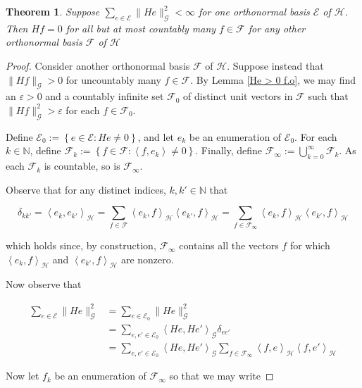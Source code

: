 \documentclass[10pt,a4paper]{amsart}
\newtheorem{theorem}{Theorem}
\newcommand{\N}{\mathbb{N}}
\newcommand{\aset}[1]{\left \langle #1 \right \rangle}
\newcommand{\bset}[1]{\left \lbrace #1 \right \rbrace}
\begin{document}
\begin{theorem} \label{He > 0 f.o. regardless of ONB}
    Suppose $\sum_{e \in \mathscr E} \|He\|_\mathcal G^2 < \infty$ for one orthonormal basis $\mathscr E$ of $\mathcal H$. Then $Hf = 0$ for all but at most countably many $f \in \mathscr F$ for any other orthonormal basis $\mathscr F$ of $\mathcal H$
\end{theorem}

\begin{proof}
    Consider another orthonormal basis $\mathscr F$ of $\mathcal H$. Suppose instead that $\|Hf\|_\mathcal G > 0$ for uncountably many $f \in \mathscr F$. By Lemma \ref{He > 0 f.o}, we may find an $\varepsilon > 0$ and a countably infinite set $\mathscr F_0$ of distinct unit vectors in $\mathscr F$ such that $\|Hf\|^2_\mathcal G > \varepsilon$ for each $f \in \mathscr F_0$.

    Define $\mathscr E_0 := \bset{e \in \mathscr E: He \neq 0}$, and let $e_k$ be an enumeration of $\mathscr E_0$. For each $k \in \N$, define $\mathscr F_k := \bset{f \in \mathscr F: \aset{f, e_k} \neq 0} $. Finally, define $\mathscr F_\infty := \bigcup_{k=0}^\infty \mathscr F_k$. As each $\mathscr F_k$ is countable, so is $\mathscr F_\infty$. 
    
   Observe that for any distinct indices, $k, k' \in \N$ that 

   $$\delta_{kk'} = \aset{e_k, e_{k'}}_\mathcal H = \sum_{f \in \mathscr F} \aset{e_k, f}_\mathcal H \aset{e_{k'}, f}_\mathcal H = \sum_{f \in \mathscr F_\infty} \aset{e_k, f}_\mathcal H \aset{e_{k'}, f}_\mathcal H$$

   which holds since, by construction, $\mathscr F_\infty$ contains all the vectors $f$ for which $\aset{e_k,f}_\mathcal H$ and $\aset{e_{k'}, f}_\mathcal H$ are nonzero. 
    
    Now observe that 

    \begin{align*}
        \sum_{e \in \mathscr E} \|He\|^2_\mathcal G
        &= 
         \sum_{e \in \mathscr E_0} \|He\|^2_\mathcal G
         \\&=
          \sum_{e, e' \in \mathscr E_0} \aset{He, He'}_{\mathcal G} \delta_{ee'}
            \\&=
          \sum_{e, e' \in \mathscr E_0} \aset{He, He'}_{\mathcal G} 
          \sum_{f \in \mathscr F_\infty} \aset{f,e}_\mathcal H \aset{f,e'}_\mathcal H
    \end{align*}

    Now let $f_k$ be an enumeration of $\mathscr F_\infty$ so that we may write 


\end{proof}
\end{document}
